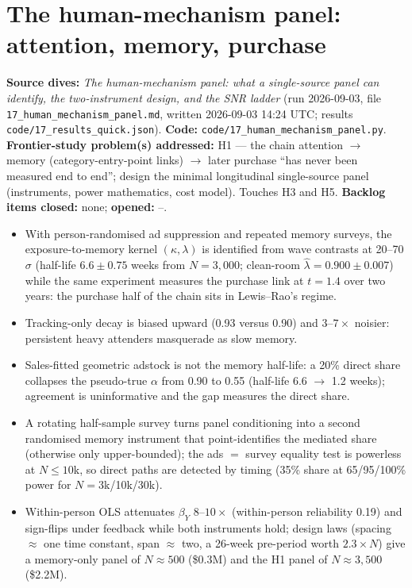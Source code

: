 \chapter{The human-mechanism panel: attention, memory, purchase}
\label{ch:panel}

\begin{provenance}
\textbf{Source dives:}  \emph{The human-mechanism panel: what a single-source panel can identify, the two-instrument design, and the SNR ladder} (run 2026-09-03, file \texttt{17\_human\_mechanism\_panel.md}, written 2026-09-03 14:24 UTC; results \texttt{code/17\_results\_quick.json}).
\textbf{Code:} \texttt{code/17\_human\_mechanism\_panel.py}.
\textbf{Frontier-study problem(s) addressed:} H1 --- the chain attention $\to$ memory (category-entry-point links) $\to$ later purchase ``has never been measured end to end''; design the minimal longitudinal single-source panel (instruments, power mathematics, cost model). Touches H3 and H5.
\textbf{Backlog items closed:} none; \textbf{opened:} --.
\end{provenance}

\begin{keyideas}
\begin{itemize}
\item With person-randomised ad suppression and repeated memory surveys, the exposure-to-memory kernel $(\kappa, \lambda)$ is identified from wave contrasts at 20--70$\sigma$ (half-life $6.6 \pm 0.75$ weeks from $N = 3{,}000$; clean-room $\hat\lambda = 0.900 \pm 0.007$) while the same experiment measures the purchase link at $t = 1.4$ over two years: the purchase half of the chain sits in Lewis--Rao's regime.
\item Tracking-only decay is biased upward (0.93 versus 0.90) and $3$--$7\times$ noisier: persistent heavy attenders masquerade as slow memory.
\item Sales-fitted geometric adstock is not the memory half-life: a 20\% direct share collapses the pseudo-true $\alpha$ from 0.90 to 0.55 (half-life 6.6 $\to$ 1.2 weeks); agreement is uninformative and the gap measures the direct share.
\item A rotating half-sample survey turns panel conditioning into a second randomised memory instrument that point-identifies the mediated share (otherwise only upper-bounded); the ads $=$ survey equality test is powerless at $N \le 10$k, so direct paths are detected by timing (35\% share at 65/95/100\% power for $N = 3$k/10k/30k).
\item Within-person OLS attenuates $\beta_Y$ $8$--$10\times$ (within-person reliability 0.19) and sign-flips under feedback while both instruments hold; design laws (spacing $\approx$ one time constant, span $\approx$ two, a 26-week pre-period worth $2.3\times N$) give a memory-only panel of $N \approx 500$ (\$0.3M) and the H1 panel of $N \approx 3{,}500$ (\$2.2M).
\end{itemize}
\end{keyideas}

